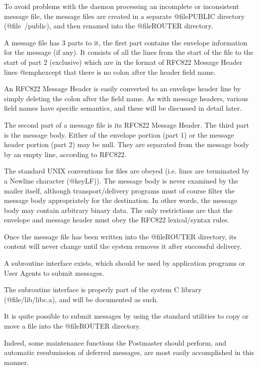To avoid problems with the daemon processing an incomplete
or inconsistent message file, the message files are created
in a separate @file{PUBLIC} directory (@file{~/public}), and
then renamed into the @file{ROUTER} directory.

A message file has 3 parts to it, the first part contains
the envelope information for the message (if any).
It consists of all the lines from the start of the file to
the start of part 2 (exclusive) which are in the format of
RFC822 Message Header lines @emph{except} that there is no
colon after the header field name.

An RFC822 Message Header is easily converted to an envelope
header line by simply deleting the colon after the field name.
As with message headers, various field names have specific
semantics, and these will be discussed in detail later.

The second part of a message file is its RFC822 Message Header.
The third part is the message body. Either of the envelope portion
(part 1) or the message header portion (part 2) may be null.
They are separated from the message body by an empty line,
according to RFC822.

The standard UNIX conventions for files are obeyed (i.e. lines
are terminated by a Newline character (@key{LF})).
The message body is never examined by the mailer itself, although
transport/delivery programs must of course filter the message body
appropriately for the destination.
In other words, the message body may contain arbitrary binary data.
The only restrictions are that the envelope and message header must
obey the RFC822 lexical/syntax rules.


Once the message file has been written into the @file{ROUTER}
directory, its content will never change until the system removes
it after successful delivery.


A subroutine interface exists, which should be used by application
programs or User Agents to submit messages.

The subroutine interface is properly part of the system C library
(@file{/lib/libc.a}), and will be documented as such.

It is quite possible to submit messages by using the standard
utilities to copy or move a file into the @file{ROUTER} directory.

Indeed, some maintenance functions the Postmaster should perform,
and automatic resubmission of deferred messages, are most easily
accomplished in this manner.

